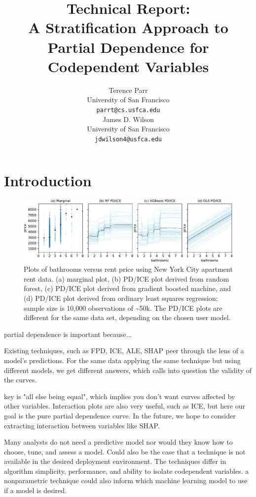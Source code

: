\documentclass{article}
\title{Technical Report:\\
A Stratification Approach to Partial Dependence for Codependent Variables}
\author{%
  Terence Parr \\
  University of San Francisco\\
  \texttt{parrt@cs.usfca.edu} \\
  \And
  James D. Wilson \\
  University of San Francisco\\
  \texttt{jdwilson4@usfca.edu} \\
}
\begin{document}
\maketitle

\begin{abstract}
\end{abstract}

\section{Introduction}

\begin{figure}[htbp]
\begin{center}
\includegraphics[scale=0.55]{images/bathrooms_vs_price.pdf}
\caption{\footnotesize Plots of bathrooms versus rent price using New York City apartment rent data. (a) marginal plot, (b) PD/ICE plot derived from random forest, (c) PD/ICE plot derived from gradient boosted machine, and (d) PD/ICE plot derived from ordinary least squares regression; sample size is 10,000 observations of \textasciitilde50k. The PD/ICE plots are  different for the same data set, depending on the chosen user model.}
\label{fig:baths_price}
\end{center}
\end{figure}

partial dependence is important because...

Existing techniques, such as FPD, ICE, ALE, SHAP peer through the lens of a model's predictions. For the same data applying the same technique but using different models, we get different answers, which calls into question the validity of the curves.

key is "all else being equal", which implies you don't want curves affected by other variables. Interaction plots are also very useful, such as ICE, but here our goal is the pure partial dependence curve. In the future, we hope to consider extracting interaction between variables like SHAP.

Many analysts do not need a predictive model nor would they know how to choose, tune, and assess a model. Could also be the case that a technique is not available in the desired deployment environment.  The techniques differ in algorithm simplicity, performance, and ability to isolate codependent variables. a nonparametric technique could also inform which machine learning model to use if a model is desired.
\end{document}
